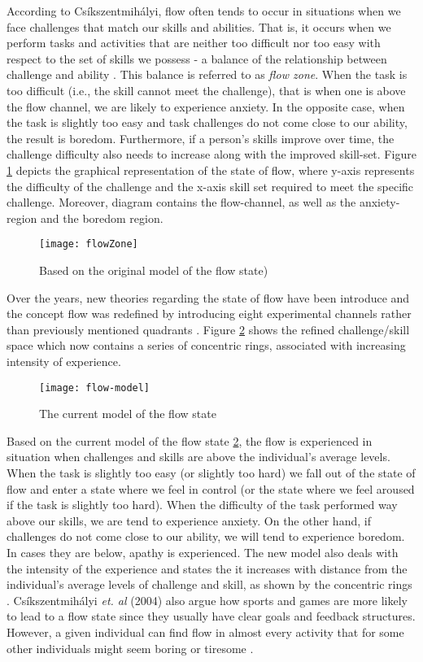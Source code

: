 According to Cs\'{i}kszentmih\'{a}lyi, flow often tends to occur in situations when we face challenges that match our skills and abilities. That is, it occurs when we perform tasks and activities that are neither too difficult nor too easy with respect to the set of skills we possess - a balance of the relationship between challenge and ability \cite{csikszentmihalyi1997finding, flow1990psychology, csikszentmihalyi1996flow}. This balance is referred to as \textit{flow zone}. When the task is too difficult (i.e., the skill cannot meet the challenge), that is when one is above the flow channel, we are likely to experience anxiety. In the opposite case, when the task is slightly too easy and task challenges do not come close to our ability, the result is boredom. Furthermore, if a person's skills improve over time, the challenge difficulty also needs to increase along with the improved skill-set. Figure \ref{fig:flowZone} depicts the graphical representation of the state of flow, where y-axis represents the difficulty of the challenge and the x-axis skill set required to meet the specific challenge. Moreover, diagram contains the flow-channel, as well as the anxiety-region and the boredom region. 
\begin{figure}[h]
    \centering
    \texttt{[image: flowZone]}
    \caption{Based on the original model of the flow state)}
    \label{fig:flowZone}
\end{figure}
Over the years, new theories regarding the state of flow have been introduce and the concept flow was redefined by introducing eight experimental channels rather than previously mentioned quadrants \cite{nakamura2014concept}. Figure \ref{fig:flowModel} shows the refined challenge/skill space which now contains a series of concentric rings, associated with increasing intensity of experience.
\begin{figure}[h]
    \centering
    \texttt{[image: flow-model]}
    \caption{The current model of the flow state \cite{nakamura2014concept}}
    \label{fig:flowModel}
\end{figure}
Based on the current model of the flow state \ref{fig:flowModel}, the flow is experienced in situation when challenges and
skills are above the individual's average levels. When the task is slightly too easy (or slightly too hard) we fall out of the state of flow and enter a state where we feel in control (or the state where we feel aroused if the task is slightly too hard). When the difficulty of the task performed way above our skills, we are tend to experience anxiety. On the other hand, if challenges do not come close to our ability, we will tend to experience boredom. In cases they are below, apathy is experienced. The new model also deals with the intensity of the experience and states the it increases with distance from the individual's average levels of challenge and skill, as shown by the concentric rings \cite{nakamura2014concept}.
Cs\'{i}kszentmih\'{a}lyi \textit{et. al} (2004) also argue how sports and games are more likely to lead to a flow state since they usually have clear goals and feedback structures. However, a given individual can find flow in almost every activity that for some other individuals might seem boring or tiresome \cite{csikszentmihalyi2014flow}.

